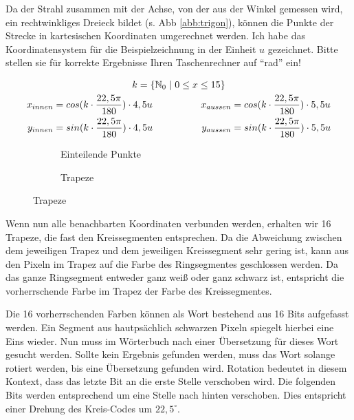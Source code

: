 Da der Strahl zusammen mit der Achse, von der aus der Winkel gemessen wird, ein rechtwinkliges Dreieck bildet (s. Abb \ref{abb:trigon}), können die Punkte der Strecke in kartesischen Koordinaten umgerechnet werden. Ich habe das Koordinatensystem für die Beispielzeichnung in der Einheit \(u\) gezeichnet. Bitte stellen sie für korrekte Ergebnisse Ihren Taschenrechner auf "`rad"' ein!

\begin{gather}
k = \{\mathbb{N}_0 \hspace{0.3em}|\hspace{0.3em} 0 \le x \le 15\} \\
\begin{split}
x_{innen} &= cos(k \cdot \frac{22,5\pi}{180}) \cdot 4,5u \\
y_{innen} &= sin(k \cdot \frac{22,5\pi}{180}) \cdot 4,5u
\end{split}
\hspace{5em}
\begin{split}
x_{aussen} &= cos(k \cdot \frac{22,5\pi}{180}) \cdot 5,5u \\
y_{aussen} &= sin(k \cdot \frac{22,5\pi}{180}) \cdot 5,5u
\end{split}
\end{gather}

\begin{figure}[!ht]
	\begin{subfigure}[b]{0.5\textwidth}
		\centering	
		
		\caption{Einteilende Punkte}
	\end{subfigure}
	\begin{subfigure}[b]{0.5\textwidth}
		\centering	
		
		\caption{Trapeze}
	\end{subfigure}
\end{figure}

Wenn nun alle benachbarten Koordinaten verbunden werden, erhalten wir 16 Trapeze, die fast den Kreissegmenten entsprechen. Da die Abweichung zwischen dem jeweiligen Trapez und dem jeweiligen Kreissegment sehr gering ist, kann aus den Pixeln im Trapez auf die Farbe des Ringsegmentes geschlossen werden. Da das ganze Ringsegment entweder ganz weiß oder ganz schwarz ist, entspricht die vorherrschende Farbe im Trapez der Farbe des Kreissegmentes.

Die 16 vorherrschenden Farben können als Wort bestehend aus 16 Bits aufgefasst werden. Ein Segment aus hautpsächlich schwarzen Pixeln spiegelt hierbei eine Eins wieder. Nun muss im Wörterbuch nach einer Übersetzung für dieses Wort gesucht werden. Sollte kein Ergebnis gefunden werden, muss das Wort solange rotiert werden, bis eine Übersetzung gefunden wird. Rotation bedeutet in diesem Kontext, dass das letzte Bit an die erste Stelle verschoben wird. Die folgenden Bits werden entsprechend um eine Stelle nach hinten verschoben. Dies entspricht einer Drehung des Kreis-Codes um \(22,5^{\circ}\).

